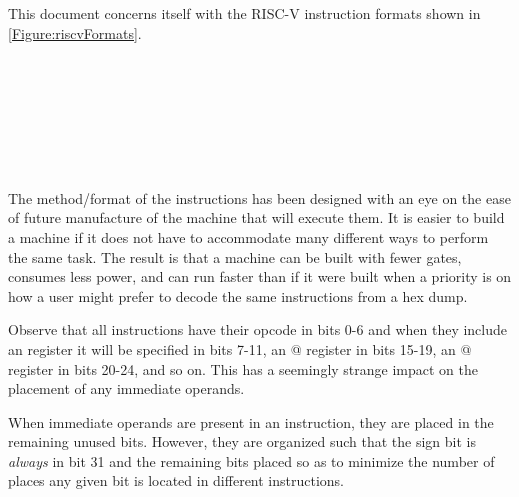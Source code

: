 


This document concerns itself with the RISC-V instruction formats shown 
in \autoref{Figure:riscvFormats}.


\begin{figure}[ht]
\\
\\
\\
\\
\\
\\
\label{Figure:riscvFormats}
\end{figure}

The method/format of the instructions has been designed with an eye on 
the ease of future manufacture of the machine that will execute them.  It is 
easier to build a machine if it does not have to accommodate many different 
ways to perform the same task.  The result is that a machine can be 
built with fewer gates, consumes less power, and can run faster than
if it were built when a priority is on how a user might prefer to decode
the same instructions from a hex dump.

Observe that all instructions have their opcode in bits 0-6 and when they
include an \verb@rd@ register it will be specified in bits 7-11, 
an @ register in bits 15-19, an @ register in bits 20-24,
and so on.  This has a seemingly strange impact on the placement of any 
immediate operands.

When immediate operands are present in an instruction, they are placed in
the remaining unused bits.  However, they are organized such that
the sign bit is {\em always} in bit 31 and the remaining bits placed so
as to minimize the number of places any given bit is located in different
instructions. 

